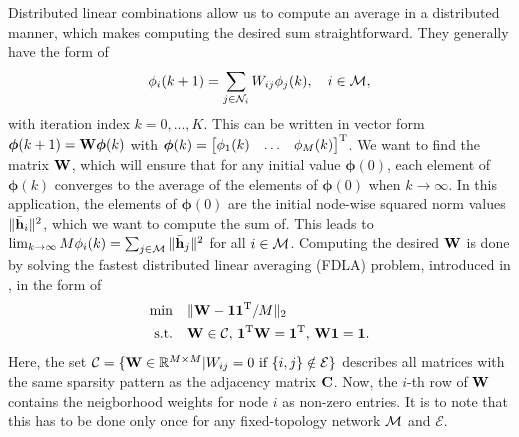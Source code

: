 \documentclass{article}
\begin{document}
Distributed linear combinations allow us to compute an average in a distributed manner, which makes computing the desired sum straightforward.
They generally have the form of
\begin{equation}
    \phi_i({k+1}) = \sum_{j \in \mathcal{N}_i} W_{ij} \phi_j({k}),\quad i\in \mathcal{M},\label{eq:adaptivenormest:distlincomb}
\end{equation}
with iteration index \(k=0,...,K\).
This can be written in vector form \(\bm{\phi}({k+1}) = \bm{\mathrm{W}} \bm{\phi}({k})\) with \(\bm{\phi}(k) = \begin{bmatrix} \phi_1(k) & \ldots & \phi_M(k) \end{bmatrix}^{\mathrm{T}}\).
We want to find the matrix \(\bm{\mathrm{W}}\), which will ensure that for any initial value \(\bm{\phi}({0})\), each element of \(\bm{\phi}({k})\) converges to the average of the elements of \(\bm{\phi}({0})\) when \(k \to \infty\).
In this application, the elements of \(\bm{\phi}(0)\) are the initial node-wise squared norm values \(\|\bar{\bm{\mathrm{h}}}_i\|^2\), which we want to compute the sum of.
This leads to \(\lim_{k \to \infty} M \phi_i(k) = \sum_{j \in \mathcal{M}} \|\bar{\bm{\mathrm{h}}}_j\|^2\) for all \(i \in \mathcal{M}\).
Computing the desired \(\bm{\mathrm{W}}\) is done by solving the fastest distributed linear averaging (FDLA) problem, introduced in \cite{xiaoFastLinearIterations2004}, in the form of
\begin{equation}
    \begin{aligned}
        \min& \quad \| \bm{\mathrm{W}} - \bm{1}\bm{1}^{\mathrm{T}}/M\|_2\\
        \text{s.t.}& \quad \bm{\mathrm{W}} \in \mathcal{C},\, \bm{1}^{\mathrm{T}} \bm{\mathrm{W}} = \bm{1}^{\mathrm{T}},\, \bm{\mathrm{W}} \bm{1}= \bm{1}.
    \end{aligned}\label{eq:adaptivenormest:fdlaminprob}
\end{equation}
Here, the set \(\mathcal{C} = \{\bm{\mathrm{W}} \in \mathbb{R}^{M \times M} \vert W_{ij} = 0 \text{ if } \{i,j\} \notin \mathcal{E}\}\) describes all matrices with the same sparsity pattern as the adjacency matrix \(\bm{\mathrm{C}}\).
Now, the \(i\)-th row of \(\bm{\mathrm{W}}\) contains the neigborhood weights for node \(i\) as non-zero entries.
It is to note that this has to be done only once for any fixed-topology network \(\mathcal{M}\) and \(\mathcal{E}\).
\end{document}
